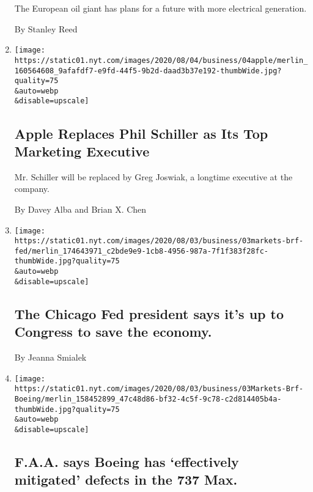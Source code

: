 \begin{enumerate}
  The European oil giant has plans for a future with more electrical
  generation.

  By Stanley Reed
\item
  \href{/2020/08/04/technology/apple-schiller-marketing-executive-departure.html}{}

  \texttt{[image: https://static01.nyt.com/images/2020/08/04/business/04apple/merlin\_160564608\_9afafdf7-e9fd-44f5-9b2d-daad3b37e192-thumbWide.jpg?quality=75\\\&auto=webp\\\&disable=upscale]}

  \hypertarget{apple-replaces-phil-schiller-as-its-top-marketing-executive}{%
  \subsection{Apple Replaces Phil Schiller as Its Top Marketing
  Executive}\label{apple-replaces-phil-schiller-as-its-top-marketing-executive}}

  Mr. Schiller will be replaced by Greg Joswiak, a longtime executive at
  the company.

  By Davey Alba and Brian X. Chen
\item
  \href{/2020/08/04/business/the-chicago-fed-president-says-its-up-to-congress-to-save-the-economy.html}{}

  \texttt{[image: https://static01.nyt.com/images/2020/08/03/business/03markets-brf-fed/merlin\_174643971\_c2bde9e9-1cb8-4956-987a-7f1f383f28fc-thumbWide.jpg?quality=75\\\&auto=webp\\\&disable=upscale]}

  \hypertarget{the-chicago-fed-president-says-its-up-to-congress-to-save-the-economy}{%
  \subsection{The Chicago Fed president says it's up to Congress to save
  the
  economy.}\label{the-chicago-fed-president-says-its-up-to-congress-to-save-the-economy}}

  By Jeanna Smialek
\item
  \href{/2020/08/04/business/faa-says-boeing-has-effectively-mitigated-defects-in-the-737-max.html}{}

  \texttt{[image: https://static01.nyt.com/images/2020/08/03/business/03Markets-Brf-Boeing/merlin\_158452899\_47c48d86-bf32-4c5f-9c78-c2d814405b4a-thumbWide.jpg?quality=75\\\&auto=webp\\\&disable=upscale]}

  \hypertarget{faa-says-boeing-has-effectively-mitigated-defects-in-the-737-max}{%
  \subsection{F.A.A. says Boeing has `effectively mitigated' defects in
  the 737
  Max.}\label{faa-says-boeing-has-effectively-mitigated-defects-in-the-737-max}}


\end{enumerate}
